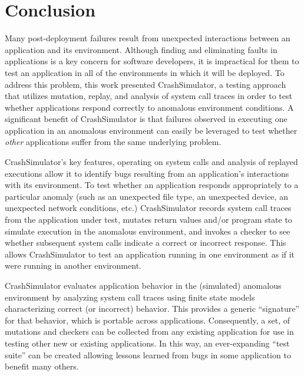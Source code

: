 \section{Conclusion}

Many post-deployment failures result from
unexpected interactions between an application and its environment.
Although finding and eliminating faults in applications is a key concern for software developers, it is impractical for them to test an application in all of the
environments in which it will be deployed.
 To address this
problem, this work presented CrashSimulator, a testing
approach that utilizes mutation, replay, and analysis of system call traces
in order to test whether applications respond correctly to 
anomalous environment conditions.
A significant benefit of CrashSimulator is that failures observed
in executing one application in an anomalous environment can
easily be leveraged to test whether {\em other} applications
suffer from the same underlying problem.

CrashSimulator's key features, operating on system calls and analysis of replayed executions allow it to identify bugs
resulting from an application's interactions with its environment.
To test whether an application responds appropriately to a particular
anomaly (such as an unexpected file type, an unexpected device, an unexpected
network conditions, etc.)
CrashSimulator records system call traces from the application under test,
mutates return values and/or program state to simulate execution in 
the anomalous environment, and invokes a checker to see whether
subsequent system calls indicate a correct or incorrect response.
This allows
CrashSimulator to test an application running in one environment
as if it were running in another environment. 


CrashSimulator evaluates application behavior in the (simulated) anomalous environment
by analyzing system call traces using
finite state models characterizing correct (or incorrect) behavior.
This provides a generic ``signature'' for that behavior, which is
portable across applications. 
Consequently, a set, of mutations and checkers can be collected from any existing
application for use in testing other new or existing applications. 
In this way, an ever-expanding ``test suite'' can
be created allowing lessons learned from bugs in some application to benefit many
others.

